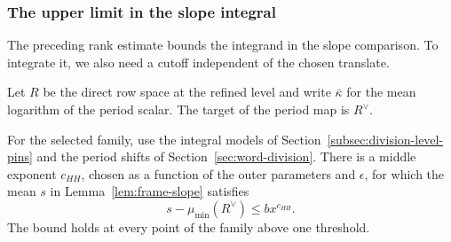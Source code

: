 \subsubsection*{The upper limit in the slope integral}
\label{par:marked-height-limit}

The preceding rank estimate bounds the integrand in the slope comparison. To integrate it, we also need a cutoff independent of the chosen translate.

Let \(R\) be the direct row space at the refined level and write
\(\bar\kappa\) for the mean logarithm of the period scalar.
The target of the period map is \(R^\vee\).

\begin{proposition}
\label{prop:marked-frame-height}
For the selected family, use the integral models of
Section~\ref{subsec:division-level-pins} and the period shifts
of Section~\ref{sec:word-division}. There is a middle exponent \(c_{HH}\),
chosen as a function of the outer parameters and \(\epsilon\), for which
the mean \(s\) in Lemma~\ref{lem:frame-slope} satisfies
\begin{equation}\label{eq:marked-frame-height}
          s-\mu_{\min}(R^\vee)\le b x^{c_{HH}} .
\end{equation}
The bound holds at every point of the family above one threshold.
\end{proposition}

